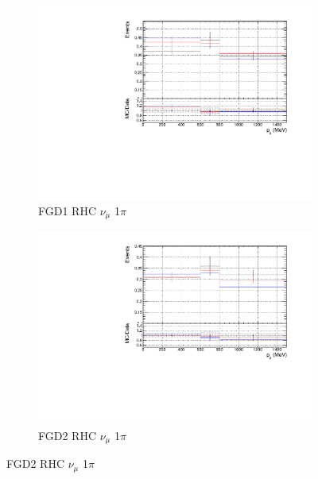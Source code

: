 \begin{figure}[!h]
\begin{subfigure}{0.49\textwidth}
  \centering
  \includegraphics[width=\textwidth]{figs/priorpred1D_p_FGD1_NuMuBkg_CC1pi_in_AntiNu_Mode}
  \caption{FGD1 RHC $\nu_{\mu}$ 1$\pi$}
\end{subfigure}
\begin{subfigure}{0.49\textwidth}
  \centering
  \includegraphics[width=\textwidth]{figs/priorpred1D_p_FGD2_NuMuBkg_CC1pi_in_AntiNu_Mode}
  \caption{FGD2 RHC $\nu_{\mu}$ 1$\pi$}
\end{subfigure}


\end{figure}
